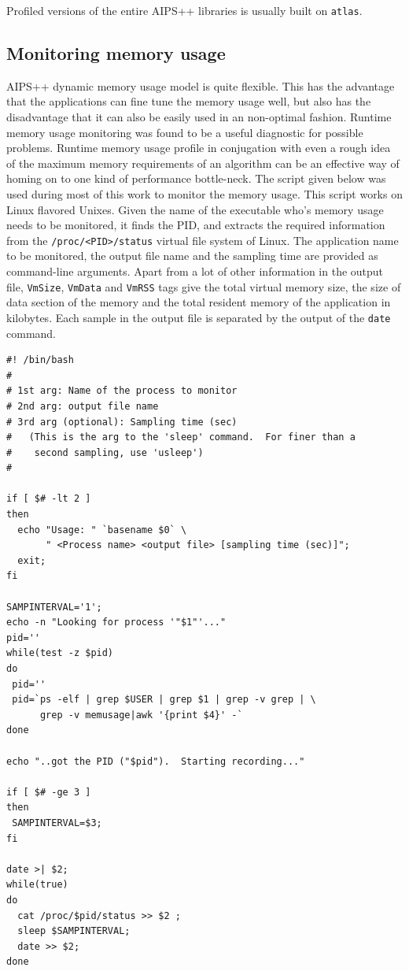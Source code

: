 Profiled versions of the entire AIPS++ libraries is usually built on
{\tt atlas}. 


\subsection{Monitoring memory usage}
\label{A:MEMUSAGE}

AIPS++ dynamic memory usage model is quite flexible.  This has the
advantage that the applications can fine tune the memory usage well,
but also has the disadvantage that it can also be easily used in an
non-optimal fashion.  Runtime memory usage monitoring was found to be
a useful diagnostic for possible problems.  Runtime memory usage
profile in conjugation with even a rough idea of the maximum memory
requirements of an algorithm can be an effective way of homing on to
one kind of performance bottle-neck.  The script given below was used
during most of this work to monitor the memory usage.  This script
works on Linux flavored Unixes.  Given the name of the executable
who's memory usage needs to be monitored, it finds the PID, and
extracts the required information from the {\tt /proc/<PID>/status}
virtual file system of Linux.  The application name to be monitored,
the output file name and the sampling time are provided as
command-line arguments.  Apart from a lot of other information in the
output file, {\tt VmSize}, {\tt VmData} and {\tt VmRSS} tags give the
total virtual memory size, the size of data section of the memory and
the total resident memory of the application in kilobytes.  Each
sample in the output file is separated by the output of the {\tt date}
command.

\begin{verbatim}
#! /bin/bash 
#
# 1st arg: Name of the process to monitor
# 2nd arg: output file name
# 3rd arg (optional): Sampling time (sec) 
#   (This is the arg to the 'sleep' command.  For finer than a 
#    second sampling, use 'usleep')
#

if [ $# -lt 2 ]
then 
  echo "Usage: " `basename $0` \
       " <Process name> <output file> [sampling time (sec)]";
  exit;
fi

SAMPINTERVAL='1';
echo -n "Looking for process '"$1"'..."
pid=''
while(test -z $pid)
do
 pid=''
 pid=`ps -elf | grep $USER | grep $1 | grep -v grep | \
      grep -v memusage|awk '{print $4}' -`
done

echo "..got the PID ("$pid").  Starting recording..."

if [ $# -ge 3 ]
then
 SAMPINTERVAL=$3;
fi

date >| $2;
while(true) 
do 
  cat /proc/$pid/status >> $2 ;
  sleep $SAMPINTERVAL;
  date >> $2;
done
\end{verbatim}


